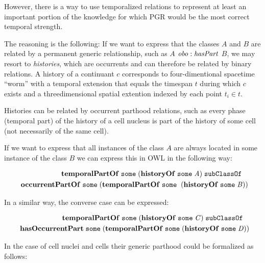 However, there is a way to use temporalized relations to represent at least an important portion of the knowledge for which PGR would be the most correct temporal strength.

The reasoning is the following: If we want to express that the classes $A$ and $B$ are related by a permanent generic relationship, such as $A$ $\mathit{obo:hasPart}$ $B$, we may resort to \emph{histories}, which are occurrents and can therefore be related by binary relations. A history of a continuant $c$ corresponds to four-dimentional spacetime ``worm'' with a temporal extension that equals the timespan $t$ during which $c$ exists and a threedimensional spatial extention indexed by each point $t_i \in t$.

Histories can be related by occurrent parthood relations, such as every phase (temporal part) of the history of a cell nucleus is part of the history of some cell (not necessarily of the same cell).  

If we want to express that all instances of the class $A$ are always located in some instance of the class $B$ we can express this in OWL in the following way:

\begin{equation}
\begin{split}
\mathrm{\mathbf{temporalPartOf}}\;\mathtt{some}\;(\mathrm{\mathbf{historyOf}}\;\mathtt{some}\;\mathit{A}) \;\mathtt{subClassOf}\ \; \; \\
\; \; \mathrm{\mathbf{occurrentPartOf}}\;\mathtt{some}\;(\mathrm{\mathbf{temporalPartOf}}\;\mathtt{some}\;
\;(\mathrm{\mathbf{historyOf}}\;\mathtt{some}\;\mathit{B}))
\end{split}
\label{eq:history:PartOf}
\end{equation}    

In a similar way, the converse case can be expressed:

\begin{equation}
\begin{split}
\mathrm{\mathbf{temporalPartOf}}\;\mathtt{some}\;(\mathrm{\mathbf{historyOf}}\;\mathtt{some}\;\mathit{C}) \;\mathtt{subClassOf}\ \; \; \\
\; \; \mathrm{\mathbf{hasOccurrentPart}}\;\mathtt{some}\;(\mathrm{\mathbf{temporalPartOf}}\;\mathtt{some}\;
(\mathrm{\mathbf{historyOf}}\;\mathtt{some}\;\mathit{D}))
\end{split}
\label{eq:history:hasPart}
\end{equation}    

In the case of cell nuclei and cells their generic parthood could be formalized as follows:

